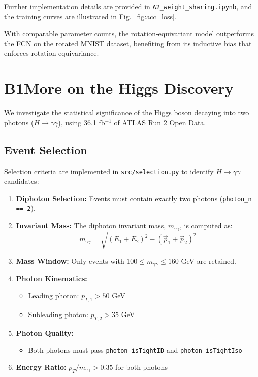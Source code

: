 \documentclass[11pt]{article}
\begin{document}
Further implementation details are provided in \texttt{A2\_weight\_sharing.ipynb}, and the training curves are illustrated in Fig.~\ref{fig:acc_loss}.

With comparable parameter counts, the rotation-equivariant model outperforms the FCN on the rotated MNIST dataset, benefiting from its inductive bias that enforces rotation equivariance.



\newpage



\section*{B1\quad More on the Higgs Discovery}

We investigate the statistical significance of the Higgs boson decaying into two photons ($H \rightarrow \gamma\gamma$), using 36.1 fb\(^{-1}\) of ATLAS Run 2 Open Data.

\subsection*{Event Selection}

Selection criteria are implemented in \texttt{src/selection.py} to identify $H \rightarrow \gamma\gamma$ candidates:
\begin{enumerate}
    \item \textbf{Diphoton Selection:} Events must contain exactly two photons (\texttt{photon\_n == 2}).
    \item \textbf{Invariant Mass:} The diphoton invariant mass, \( m_{\gamma\gamma} \), is computed as:
    \[
    m_{\gamma\gamma} = \sqrt{(E_1 + E_2)^2 - (\vec{p}_1 + \vec{p}_2)^2}
    \]
    \item \textbf{Mass Window:} Only events with \( 100 \leq m_{\gamma\gamma} \leq 160 \) GeV are retained.
    \item \textbf{Photon Kinematics:}
    \begin{itemize}
        \item Leading photon: \( p_{T,1} > 50 \) GeV
        \item Subleading photon: \( p_{T,2} > 35 \) GeV
    \end{itemize}
    \item \textbf{Photon Quality:}
    \begin{itemize}
        \item Both photons must pass \texttt{photon\_isTightID} and \texttt{photon\_isTightIso}
    \end{itemize}
    \item \textbf{Energy Ratio:} \( p_T / m_{\gamma\gamma} > 0.35 \) for both photons
\end{enumerate}
\end{document}
